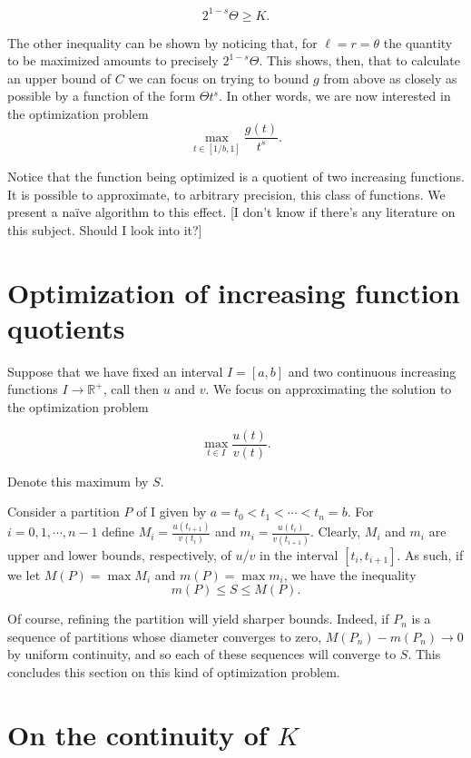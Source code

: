 \documentclass[11pt, reqno]{amsart}
\newcommand{\R}{\mathbb{R}}
\begin{document}
\[ 2^{1-s} \Theta \geq K.\]

The other inequality can be shown by noticing that, for $\ell = r = \theta$ the quantity to be maximized amounts to precisely $2^{1-s} \Theta$. This shows, then, that to calculate an upper bound of $C$ we can focus on trying to bound $g$ from above as closely as possible by a function of the form $\Theta t^s$. In other words, we are now interested in the optimization problem
\[ \max_{t \in \left[ 1/b, 1 \right]} \frac{g(t)}{t^s}.\]

Notice that the function being optimized is a quotient of two increasing functions. It is possible to approximate, to arbitrary precision, this class of functions. We present a naïve algorithm to this effect. [I don't know if there's any literature on this subject. Should I look into it?]

\section{Optimization of increasing function quotients} \label{optimization}

Suppose that we have fixed an interval $I = \left[ a, b \right]$ and two continuous increasing functions $I \to \R^+$, call then $u$ and $v$. We focus on approximating the solution to the optimization problem

\[ \max_{t \in I} \frac{u(t)}{v(t)}.\]

Denote this maximum by $S$.

Consider a partition $P$ of I given by $a = t_0 < t_1 < \cdots < t_n = b$. For $i = 0, 1, \cdots, n-1$ define $M_i = \frac{u(t_{i+1})}{v(t_i)}$ and $m_i = \frac{u(t_i)}{v(t_{i+1})}$. Clearly, $M_i$ and $m_i$ are upper and lower bounds, respectively, of $u/v$ in the interval $\left[t_i, t_{i+1} \right]$. As such, if we let $M(P) = \max M_i$ and $m(P) = \max m_i$, we have the inequality
\[m(P) \leq S \leq M(P).\]

Of course, refining the partition will yield sharper bounds. Indeed, if $P_n$ is a sequence of partitions whose diameter converges to zero, $M(P_n) - m(P_n) \to 0$ by uniform continuity, and so each of these sequences will converge to $S$. This concludes this section on this kind of optimization problem.

\section{On the continuity of $K$}
\end{document}
